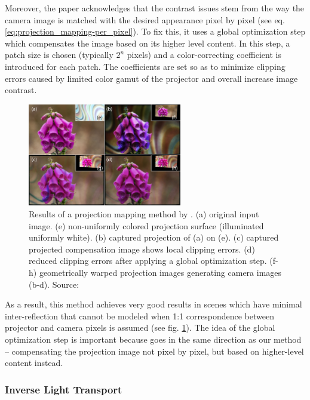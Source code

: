 Moreover, the paper acknowledges that the contrast issues stem from the way the camera image is matched with the desired appearance pixel by pixel (see eq. \ref{eq:projection_mapping-per_pixel}). To fix this, it uses a global optimization step which compensates the image based on its higher level content. In this step, a patch size is chosen (typically \(2^n\) pixels) and a color-correcting coefficient is introduced for each patch. The coefficients are set so as to minimize clipping errors caused by limited color gamut of the projector and overall increase image contrast.

\begin{figure}[ht]
    \centering
    \includegraphics[width=0.6\textwidth]{images/02-grundhofer_result_compressed.jpg}
    \caption{Results of a projection mapping method by \citet{Grundhofer2015}. (a) original input image. (e) non-uniformly colored projection surface (illuminated  uniformly white). (b) captured projection of (a) on (e). (c) captured  projected  compensation  image shows local clipping errors. (d) reduced clipping errors after applying a global optimization step. (f-h) geometrically warped projection images generating camera images (b-d). Source: \citet{Grundhofer2015}}
    \label{fig:background_grundhofer_result}
\end{figure}

As a result, this method achieves very good results in scenes which have minimal inter-reflection that cannot be modeled when 1:1 correspondence between projector and camera pixels is assumed (see fig. \ref{fig:background_grundhofer_result}). The idea of the global optimization step is important because goes in the same direction as our method -- compensating the projection image not pixel by pixel, but based on higher-level content instead.

\subsubsection{Inverse Light Transport}
\label{section:background-projection_mapping-procams-inverse_lt}

